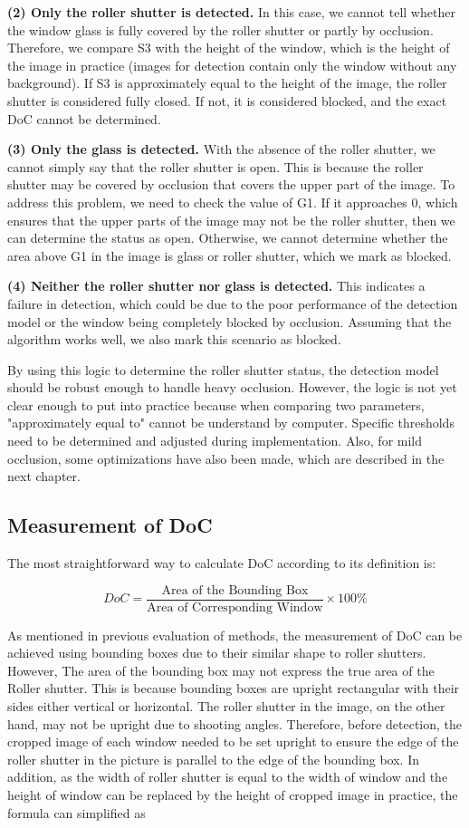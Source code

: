 \textbf{(2) Only the roller shutter is detected.} In this case, we cannot tell whether the window glass is fully covered by the roller shutter or partly by occlusion. Therefore, we compare S3 with the height of the window, which is the height of the image in practice (images for detection contain only the window without any background). If S3 is approximately equal to the height of the image, the roller shutter is considered fully closed. If not, it is considered blocked, and the exact DoC cannot be determined.

\textbf{(3) Only the glass is detected.} With the absence of the roller shutter, we cannot simply say that the roller shutter is open. This is because the roller shutter may be covered by occlusion that covers the upper part of the image. To address this problem, we need to check the value of G1. If it approaches 0, which ensures that the upper parts of the image may not be the roller shutter, then we can determine the status as open. Otherwise, we cannot determine whether the area above G1 in the image is glass or roller shutter, which we mark as blocked.

\textbf{(4) Neither the roller shutter nor glass is detected.} This indicates a failure in detection, which could be due to the poor performance of the detection model or the window being completely blocked by occlusion. Assuming that the algorithm works well, we also mark this scenario as blocked.

By using this logic to determine the roller shutter status, the detection model should be robust enough to handle heavy occlusion. However, the logic is not yet clear enough to put into practice because when comparing two parameters, "approximately equal to" cannot be understand by computer. Specific thresholds need to be determined and adjusted during implementation. Also, for mild occlusion, some optimizations have also been made, which are described in the next chapter. 
\subsection{Measurement of DoC}

The most straightforward way to calculate DoC according to its definition is:

$$ DoC = \frac{\text{Area of the Bounding Box}}{\text{Area of Corresponding Window}} \times 100\%
$$

As mentioned in previous evaluation of methods, the measurement of DoC can be achieved using bounding boxes due to their similar shape to roller shutters. However, The area of the bounding box may not express the true area of the Roller shutter. This is because bounding boxes are upright rectangular with their sides either vertical or horizontal. The roller shutter in the image, on the other hand, may not be upright due to shooting angles. Therefore, before detection, the cropped image of each window needed to be set upright to ensure the edge of the roller shutter in the picture is parallel to the edge of the bounding box. In addition, as the width of roller shutter is equal to the width of window and the height of window can be replaced by the height of cropped image in practice, the formula can simplified as 

